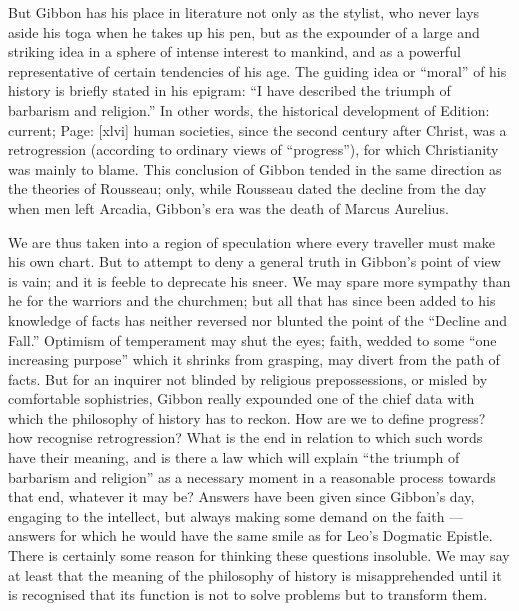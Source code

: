 {}But Gibbon has his place in literature not only as the stylist, who never lays aside his toga when he takes up his pen, but as the expounder of a large and striking idea in a sphere of intense interest to mankind, and as a powerful representative of certain tendencies of his age. The guiding idea or \texthebrew{“}moral\texthebrew{}” of his history is briefly stated in his epigram: \texthebrew{“}I have described the triumph of barbarism and religion.\texthebrew{}” In other words, the historical development of Edition: current; Page: [xlvi] human societies, since the second century after Christ, was a retrogression (according to ordinary views of \texthebrew{“}progress\texthebrew{}”), for which Christianity was mainly to blame. This conclusion of Gibbon tended in the same direction as the theories of Rousseau; only, while Rousseau dated the decline from the day when men left Arcadia, Gibbon\texthebrew{}’s era was the death of Marcus Aurelius.

We are thus taken into a region of speculation where every traveller must make his own chart. But to attempt to deny a general truth in Gibbon\texthebrew{}’s point of view is vain; and it is feeble to deprecate his sneer. We may spare more sympathy than he for the warriors and the churchmen; but all that has since been added to his knowledge of facts has neither reversed nor blunted the point of the \texthebrew{“}Decline and Fall.\texthebrew{}” Optimism of temperament may shut the eyes; faith, wedded to some \texthebrew{“}one increasing purpose\texthebrew{}” which it shrinks from grasping, may divert from the path of facts. But for an inquirer not blinded by religious prepossessions, or misled by comfortable sophistries, Gibbon really expounded one of the chief data with which the philosophy of history has to reckon. How are we to define progress? how recognise retrogression? What is the end in relation to which such words have their meaning, and is there a law which will explain \texthebrew{“}the triumph of barbarism and religion\texthebrew{}” as a necessary moment in a reasonable process towards that end, whatever it may be? Answers have been given since Gibbon\texthebrew{}’s day, engaging to the intellect, but always making some demand on the faith \texthebrew{—} answers for which he would have the same smile as for Leo\texthebrew{}’s Dogmatic Epistle. There is certainly some reason for thinking these questions insoluble. We may say at least that the meaning of the philosophy of history is misapprehended until it is recognised that its function is not to solve problems but to transform them.

